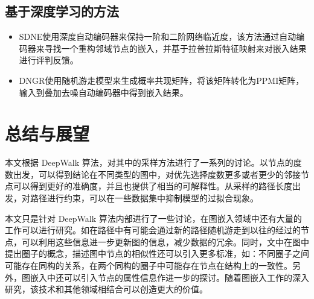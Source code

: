 \documentclass{ctexart}
\begin{document}
\subsection{基于深度学习的方法}
\begin{itemize}
    \item SDNE使用深度自动编码器来保持一阶和二阶网络临近度，该方法通过自动编码器来寻找一个重构邻域节点的嵌入，并基于拉普拉斯特征映射来对嵌入结果进行评判反馈。
    \item DNGR使用随机游走模型来生成概率共现矩阵，将该矩阵转化为PPMI矩阵，输入到叠加去噪自动编码器中得到嵌入结果。
\end{itemize}

\section{总结与展望}

本文根据 DeepWalk 算法，对其中的采样方法进行了一系列的讨论。以节点的度数出发，可以得到结论在不同类型的图中，对优先选择度数更多或者更少的邻接节点可以得到更好的准确度，并且也提供了相当的可解释性。从采样的路径长度出发，对路径进行约束，可以在一些数据集中抑制模型的过拟合现象。

本文只是针对 DeepWalk 算法内部进行了一些讨论，在图嵌入领域中还有大量的工作可以进行研究。如在路径中有可能会通过新的路径随机游走到以往的经过的节点，可以利用这些信息进一步更新图的信息，减少数据的冗余。同时，文中在图中提出圈子的概念，描述图中节点的相似性还可以引入更多标准，如：不同圈子之间可能存在同构的关系，在两个同构的圈子中可能存在节点在结构上的一致性。另外，图嵌入中还可以引入节点的属性信息作进一步的探讨。随着图嵌入工作的深入研究，该技术和其他领域相结合可以创造更大的价值。


\end{document}
